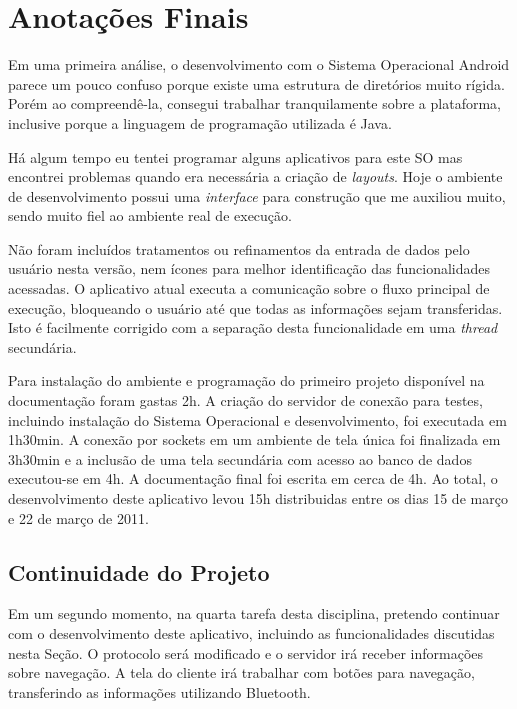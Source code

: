 \documentclass{article}
\begin{document}
\section{Anotações Finais}
\label{sec:anotacoes}

Em uma primeira análise, o desenvolvimento com o Sistema Operacional Android
parece um pouco confuso porque existe uma estrutura de diretórios muito rígida.
Porém ao compreendê-la, consegui trabalhar tranquilamente sobre a plataforma,
inclusive porque a linguagem de programação utilizada é Java.

Há algum tempo eu tentei programar alguns aplicativos para este SO mas encontrei
problemas quando era necessária a criação de \emph{layouts}. Hoje o ambiente de
desenvolvimento possui uma \emph{interface} para construção que me auxiliou
muito, sendo muito fiel ao ambiente real de execução.

Não foram incluídos tratamentos ou refinamentos da entrada de dados pelo usuário
nesta versão, nem ícones para melhor identificação das funcionalidades
acessadas. O aplicativo atual executa a comunicação sobre o fluxo principal de
execução, bloqueando o usuário até que todas as informações sejam transferidas.
Isto é facilmente corrigido com a separação desta funcionalidade em uma
\emph{thread} secundária.

Para instalação do ambiente e programação do primeiro projeto disponível na
documentação foram gastas 2h. A criação do servidor de conexão para testes,
incluindo instalação do Sistema Operacional e desenvolvimento, foi executada em
1h30min. A conexão por sockets em um ambiente de tela única foi finalizada em
3h30min e a inclusão de uma tela secundária com acesso ao banco de dados
executou-se em 4h. A documentação final foi escrita em cerca de 4h. Ao total, o
desenvolvimento deste aplicativo levou 15h distribuidas entre os dias 15 de
março e 22 de março de 2011.

\subsection{Continuidade do Projeto}

Em um segundo momento, na quarta tarefa desta disciplina, pretendo continuar com
o desenvolvimento deste aplicativo, incluindo as funcionalidades discutidas
nesta Seção. O protocolo será modificado e o servidor irá receber informações
sobre navegação. A tela do cliente irá trabalhar com botões para navegação,
transferindo as informações utilizando Bluetooth.
\end{document}
